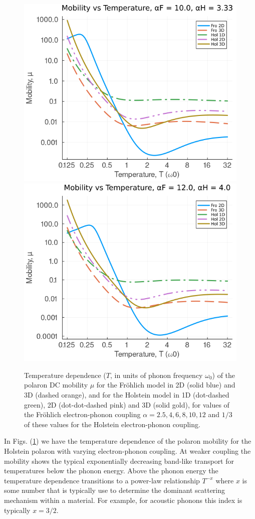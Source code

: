 \begin{figure}[!tbp]
    \includegraphics[width=.49\textwidth]{figures/mobility_temp_10_333.png}
    \includegraphics[width=.49\textwidth]{figures/mobility_temp_12_4.png}
    \caption{Temperature dependence ($T$, in units of phonon frequency $\omega_0$) of the polaron DC mobility $\mu$ for the Fr\"ohlich model in 2D (solid blue) and 3D (dashed orange), and for the Holstein model in 1D (dot-dashed green), 2D (dot-dot-dashed pink) and 3D (solid gold), for values of the Fr\"ohlich electron-phonon coupling $\alpha = 2.5, 4, 6, 8, 10, 12$ and $1/3$ of these values for the Holstein electron-phonon coupling.}
    \label{fig:mobility_temp}
\end{figure}

In Figs. (\ref{fig:mobility_temp}) we have the temperature dependence of the polaron mobility for the Holstein polaron with varying electron-phonon coupling. At weaker coupling the mobility shows the typical exponentially decreasing band-like transport for temperatures below the phonon energy. Above the phonon energy the temperature dependence transitions to a power-law relationship $T^{-x}$ where $x$ is some number that is typically use to determine the dominant scattering mechanism within a material. For example, for acoustic phonons this index is typically $x = 3/2$. 
\newline

